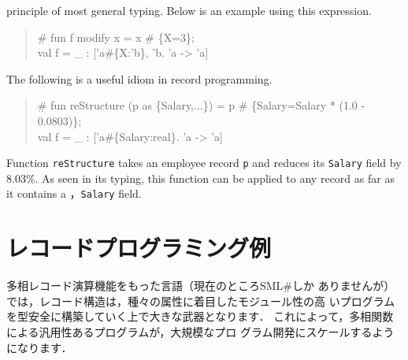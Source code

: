 \documentclass{jbook}
\newif\ifjp
\newcommand{\txt}[2]{#1}
\newcommand{\smlsharp}{SML\#}
\begin{document}
principle of most general typing.
	Below is an example using this expression.
\begin{tt}\begin{quote}
\# fun f modify x = x \# \{X=3\};\\
val f = \_ : ['a\#\{X:'b\}, 'b.  'a -> 'a]
\end{quote}\end{tt}
	The following is a useful idiom in record programming.
\begin{tt}\begin{quote}
\# fun reStructure (p as \{Salary,...\}) = p \# \{Salary=Salary * (1.0 - 0.0803)\};\\
val f = \_ : ['a\#\{Salary:real\}.  'a -> 'a]
\end{quote}\end{tt}
	Function {\tt reStructure} takes an employee record {\tt p} and 
reduces its {\tt Salary} field by 8.03\%.
	As seen in its typing, this function can be applied to any
record as far as it contains a ，{\tt Salary} field.
\fi%

\section{\txt{レコードプログラミング例}{Record programming examples}}
\label{sec:extensionRecordProgramming}

\ifjp%
	多相レコード演算機能をもった言語（現在のところ\smlsharp{}しか
ありませんが）では，レコード構造は，種々の属性に着目したモジュール性の高
いプログラムを型安全に構築していく上で大きな武器となります．
	これによって，多相関数による汎用性あるプログラムが，大規模なプロ
グラム開発にスケールするようになります．
\end{document}
